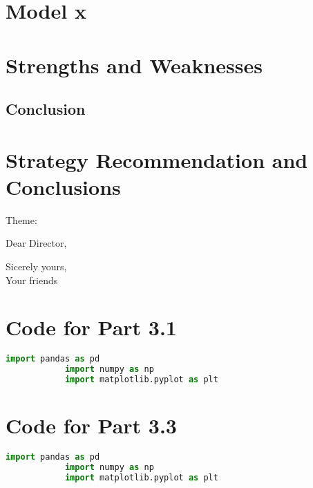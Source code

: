 \documentclass{mcmthesis}%
\begin{document}
	\section{Model x}
	
	\section{Strengths and Weaknesses}
	
	\subsection{Conclusion}

	\section{Strategy Recommendation and Conclusions}
	\noindent Theme: %
	\begin{letter}{Dear Director,}
        
		
		\vspace{\parskip}
		Sicerely yours,\\
		Your friends
	\end{letter}
	
	\begin{thebibliography}{99}
	\end{thebibliography}
	
	\begin{appendices}
		\section{Code for Part 3.1}
		\begin{lstlisting}[language=python]
			import pandas as pd
			import numpy as np
			import matplotlib.pyplot as plt
		\end{lstlisting}
		
		\section{Code for Part 3.3}
		\begin{lstlisting}[language=python]
			import pandas as pd
			import numpy as np
			import matplotlib.pyplot as plt	
		\end{lstlisting}	
	\end{appendices}
\end{document}
